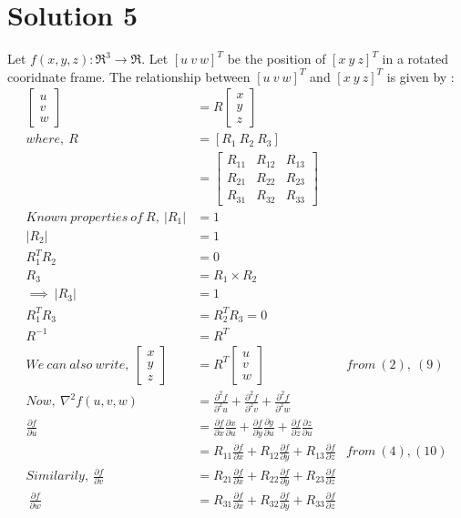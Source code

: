 \documentclass[a4paper,fleqn,11pt]{article}
\theoremstyle{mytheor}
\begin{document}
\section*{Solution 5}

Let $f(x, y, z) : \Re^3 \rightarrow \Re$. Let $[u\ v\ w]^T$ be the position of $[x\ y\ z]^T$ in a rotated cooridnate frame.
The relationship between $[u\ v\ w]^T$ and $[x\ y\ z]^T$ is given by :
\begin{align}
\begin{bmatrix}
	u \\
	v \\
	w
\end{bmatrix} & =
	R
\begin{bmatrix}
	x \\
	y \\
	z
\end{bmatrix} \\
where,\ R & = [R_1\ R_2\ R_3] \\
& = \begin{bmatrix}
		R_{11} & R_{12} & R_{13} \\
		R_{21} & R_{22} & R_{23} \\
		R_{31} & R_{32} & R_{33}
	\end{bmatrix} \\
Known\ properties\ of\ R,\ |R_1| & = 1 \\
|R_2| & = 1 \\
R_1^T R_2 & = 0 \\
R_3  & = R_1 \times R_2 \\
\implies\ |R_3| & = 1 \\
R_1^T R_3 & = R_2^T R_3 = 0 \\
R^{-1} & = R^T \\
We\ can\ also\ write,\
\begin{bmatrix}
	x \\
	y \\
	z
\end{bmatrix} & =
	R^T
\begin{bmatrix}
	u \\
	v \\
	w
\end{bmatrix} & from\ (2),\ (9) \\
Now,\ \nabla^2 f(u, v, w) & = \frac{\partial^2 f}{\partial^2 u} +
							  \frac{\partial^2 f}{\partial^2 v} +
						      \frac{\partial^2 f}{\partial^2 w} \\
\frac{\partial f}{\partial u} & =
\frac{\partial f}{\partial x}\frac{\partial x}{\partial u} +
\frac{\partial f}{\partial y}\frac{\partial y}{\partial u} +
\frac{\partial f}{\partial z}\frac{\partial z}{\partial u} \\
& = R_{11}\frac{\partial f}{\partial x} +
	R_{12}\frac{\partial f}{\partial y} +
	R_{13}\frac{\partial f}{\partial z} & from\ (4), (10) \\
Similarily,\ \frac{\partial f}{\partial v}
& = R_{21}\frac{\partial f}{\partial x} +
	R_{22}\frac{\partial f}{\partial y} +
	R_{23}\frac{\partial f}{\partial z}\\
\ \frac{\partial f}{\partial w}
& = R_{31}\frac{\partial f}{\partial x} +
	R_{32}\frac{\partial f}{\partial y} +
	R_{33}\frac{\partial f}{\partial z}
\end{align}
\end{document}

